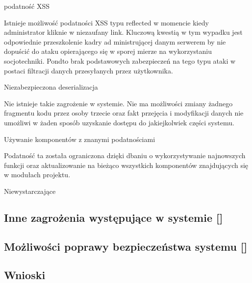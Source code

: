 \begin{enumerate*}
	 \item podatność XSS
	 
	 Istnieje możliwość podatności XSS typu reflected w momencie kiedy administrator kliknie w niezaufany link. Kluczową kwestią w tym wypadku jest odpowiednie przeszkolenie kadry ad ministrującej danym serwerem by nie dopuścić do ataku opierającego się w sporej mierze na wykorzystaniu socjotechniki. Pondto brak podstawowych zabezpieczeń na tego typu ataki w postaci filtracji danych przesyłanych przez użytkownika. 
	 
	 \item Niezabezpieczona deserializacja
	 
	 Nie istnieje takie zagrożenie w systemie. Nie ma możliwości zmiany żadnego fragmentu kodu przez osoby trzecie oraz fakt przejęcia i modyfikacji danych nie umożliwi w żaden sposób uzyskanie dostępu do jakiejkolwiek części systemu.
	 
	 \item  Używanie komponentów z znanymi podatnościami
	 
	 Podatność ta została ograniczona dzięki dbaniu o wykorzystywanie najnowszych funkcji oraz aktualizowanie na bieżąco wszystkich komponentów znajdujących się w modułach projektu.
	 
	 \item Niewystarczające      
\end{enumerate*}

\subsection{Inne zagrożenia występujące w systemie [\StudentB]}

\subsection{Możliwości poprawy bezpieczeństwa systemu [\StudentA]}

\subsection{Wnioski}
 
